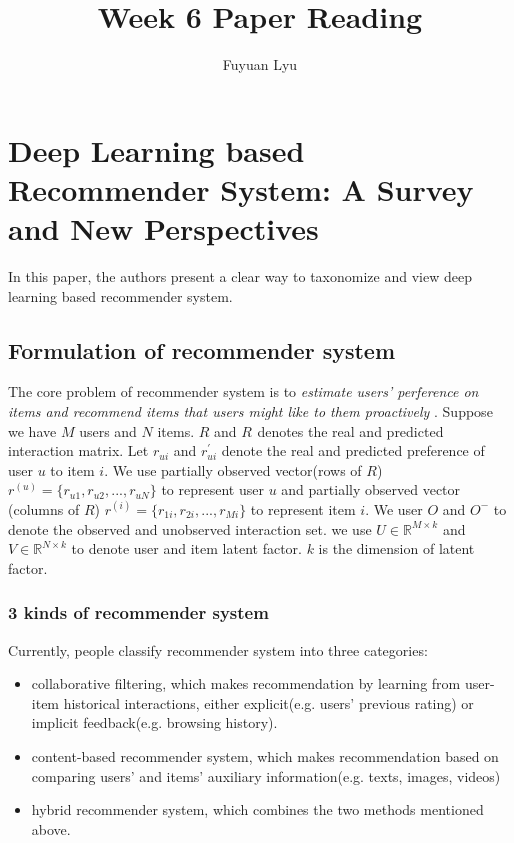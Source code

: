 \documentclass[11pt]{scrartcl}
\title{Week 6 Paper Reading}
\author{Fuyuan Lyu}
\begin{document}
\maketitle

\begin{abstract}

\end{abstract}


\section{Deep Learning based Recommender System: A Survey and New Perspectives}

In this paper\cite{zhang2019deep}, the authors present a clear way to taxonomize and view deep learning based recommender system. 

\subsection{Formulation of recommender system}
The core problem of recommender system is to \textit{estimate users' perference on items and recommend items that users might like to them proactively} \cite{zhang2019deep}. Suppose we have $M$ users and $N$ items. $R$ and $R^{}$ denotes the real and predicted interaction matrix. Let $r_{ui}$ and $r_{ui}^{'}$ denote the real and predicted preference of user $u$ to item $i$. We use partially observed vector(rows of $R$) $r^{(u)} = \{r_{u1}, r_{u2}, ..., r_{uN}\}$ to represent user $u$ and partially observed vector (columns of $R$) $r^{(i)} = \{ r_{1i}, r_{2i}, ..., r_{Mi} \}$ to represent item $i$. We user $O$ and $O^{-}$ to denote the observed and unobserved interaction set. we use $U \in \mathbb{R}^{M \times k}$ and $V \in \mathbb{R}^{N \times k}$ to denote user and item latent factor. $k$ is the dimension of latent factor.


\subsubsection{3 kinds of recommender system}
Currently, people classify recommender system into three categories: 
\begin{itemize}
	\item collaborative filtering, which makes recommendation by learning from user-item historical interactions, either explicit(e.g. users' previous rating) or implicit feedback(e.g. browsing history).
	\item content-based recommender system, which makes recommendation based on comparing users' and items' auxiliary information(e.g. texts, images, videos)
	\item hybrid recommender system, which combines the two methods mentioned above.
\end{itemize}




\end{document}
